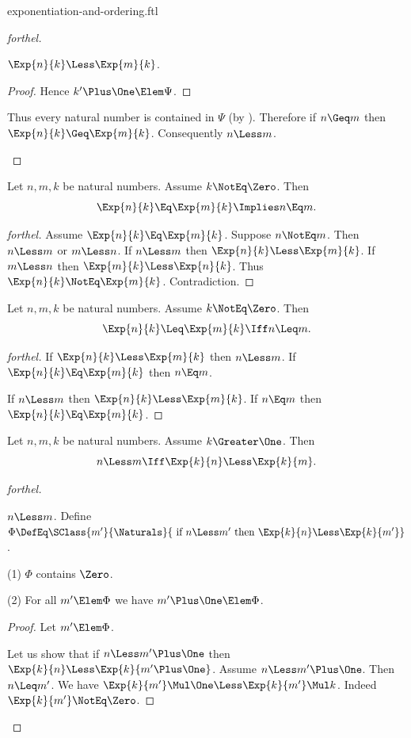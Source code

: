 \documentclass{stex}
\begin{document}
\begin{smodule}{exponentiation-and-ordering.ftl}
\begin{proof}[forthel]
\begin{case}{$\Exp{n}{k} \Less \Exp{m}{k}$.}
\begin{proof}
      Hence $k' \Plus \One \Elem \Psi$.
    \end{proof}

    Thus every natural number is contained in $\Psi$ (by ).
    Therefore if $n \Geq m$ then $\Exp{n}{k} \Geq \Exp{m}{k}$.
    Consequently $n \Less m$.
  \end{case}
\end{proof}

\begin{proposition*}[forthel]
  Let $n, m, k$ be natural numbers.
  Assume $k \NotEq \Zero$.
  Then \[ \Exp{n}{k} \Eq \Exp{m}{k} \Implies n \Eq m. \]
\end{proposition*}
\begin{proof}[forthel]
  Assume $\Exp{n}{k} \Eq \Exp{m}{k}$.
  Suppose $n \NotEq m$.
  Then $n \Less m$ or $m \Less n$.
  If $n \Less m$ then $\Exp{n}{k} \Less \Exp{m}{k}$.
  If $m \Less n$ then $\Exp{m}{k} \Less \Exp{n}{k}$.
  Thus $\Exp{n}{k} \NotEq \Exp{m}{k}$.
  Contradiction.
\end{proof}

\begin{proposition*}[forthel]
  Let $n, m, k$ be natural numbers.
  Assume $k \NotEq \Zero$.
  Then \[ \Exp{n}{k} \Leq \Exp{m}{k} \Iff n \Leq m. \]
\end{proposition*}
\begin{proof}[forthel]
  If $\Exp{n}{k} \Less \Exp{m}{k}$ then $n \Less m$.
  If $\Exp{n}{k} \Eq \Exp{m}{k}$ then $n \Eq m$.

  If $n \Less m$ then $\Exp{n}{k} \Less \Exp{m}{k}$.
  If $n \Eq m$ then $\Exp{n}{k} \Eq \Exp{m}{k}$.
\end{proof}

\begin{proposition*}[forthel]
  Let $n, m, k$ be natural numbers.
  Assume $k \Greater \One$.
  Then \[ n \Less m \Iff \Exp{k}{n} \Less \Exp{k}{m}. \]
\end{proposition*}
\begin{proof}[forthel]
  \begin{case}{$n \Less m$.}
    Define $\Phi \DefEq \SClass{m'}{\Naturals}{\text{ if }n \Less m'\text{ then }\Exp{k}{n} \Less \Exp{k}{m'}}$.

    (1) $\Phi$ contains $\Zero$.

    (2) For all $m' \Elem \Phi$ we have $m' \Plus \One \Elem \Phi$.
    \begin{proof}
      Let $m' \Elem \Phi$.

      Let us show that if $n \Less m' \Plus \One$ then $\Exp{k}{n} \Less \Exp{k}{m' \Plus \One}$.
        Assume $n \Less m' \Plus \One$.
        Then $n \Leq m'$.
        We have $\Exp{k}{m'} \Mul \One \Less \Exp{k}{m'} \Mul k$.
        Indeed $\Exp{k}{m'} \NotEq \Zero$.


\end{proof}
\end{case}
\end{proof}
\end{smodule}
\end{document}
